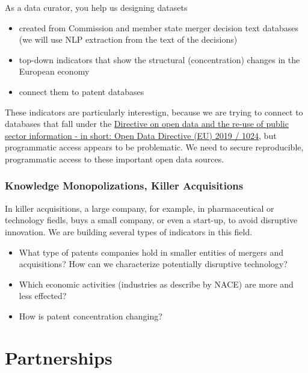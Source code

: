 \documentclass[
  a4paper,
  openany, a4paper, oneside]{book}
\providecommand{\tightlist}{%
  \setlength{\itemsep}{0pt}\setlength{\parskip}{0pt}}
\begin{document}
As a data curator, you help us designing datasets

\begin{itemize}
\tightlist
\item
  created from Commission and member state merger decision text databases (we will use NLP extraction from the text of the decisions)
\item
  top-down indicators that show the structural (concentration) changes in the European economy
\item
  connect them to patent databases
\end{itemize}

These indicators are particularly interestign, because we are trying to connect to databases that fall under the \href{https://eur-lex.europa.eu/legal-content/EN/TXT/?qid=1561563110433\&uri=CELEX:32019L1024}{Directive on open data and the re-use of public sector information - in short: Open Data Directive (EU) 2019 / 1024}, but programmatic access appears to be problematic. We need to secure reproducible, programmatic access to these important open data sources.

\hypertarget{knowledge-monopoly}{%
\subsection{Knowledge Monopolizations, Killer Acquisitions}\label{knowledge-monopoly}}

In killer acquisitions, a large company, for example, in pharmaceutical or technology fiedls, buys a small company, or even a start-up, to avoid disruptive innovation. We are building several types of indicators in this field.

\begin{itemize}
\tightlist
\item
  What type of patents companies hold in smaller entities of mergers and acquisitions? How can we characterize potentially disruptive technology?
\item
  Which economic activities (industries as describe by NACE) are more and less effected?
\item
  How is patent concentration changing?
\end{itemize}

\hypertarget{partnerships}{%
\chapter{Partnerships}\label{partnerships}}
\end{document}
